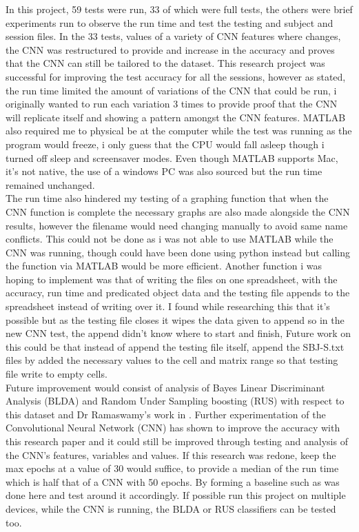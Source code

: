 In this project, 59 tests were run, 33 of which were full tests, the others were brief experiments run to observe the run time and test the testing and subject and session files. In the 33 tests, values of a variety of CNN features where changes, the CNN was restructured to provide and increase in the accuracy and proves that the CNN can still be tailored to the dataset. This research project was successful for improving the test accuracy for all the sessions, however as stated, the run time limited the amount of variations of the CNN that could be run, i originally wanted to run each variation 3 times to provide proof that the CNN will replicate itself and showing a pattern amongst the CNN features. MATLAB also required me to physical be at the computer while the test was running as the program would freeze, i only guess that the CPU would fall asleep though i turned off sleep and screensaver modes. Even though MATLAB supports Mac, it's not native, the use of a windows PC was also sourced but the run time remained unchanged. \\

The run time also hindered my testing of a graphing function that when the CNN function is complete the necessary graphs are also made alongside the CNN results, however the filename would need changing manually to avoid same name conflicts. This could not be done as i was not able to use MATLAB while the CNN was running, though could have been done using python instead but calling the function via MATLAB would be more efficient. Another function i was hoping to implement was that of writing the files on one spreadsheet, with the accuracy, run time and predicated object data and the testing file appends to the spreadsheet instead of writing over it. I found while researching this that it's possible but as the testing file closes it wipes the data given to append so in the new CNN test, the append didn't know where to start and finish, Future work on this could be that instead of append the testing file itself, append the SBJ-S.txt files by added the necessary values to the cell and matrix range so that testing file write to empty cells. \\

Future improvement would consist of analysis of Bayes Linear Discriminant Analysis (BLDA) and Random Under Sampling boosting (RUS) with respect to this dataset and Dr Ramaswamy's work in \cite{PalaniPaper}. Further experimentation of the Convolutional Neural Network (CNN) has shown to improve the accuracy with this research paper and it could still be improved through testing and analysis of the CNN's features, variables and values. If this research was redone, keep the max epochs at a value of 30 would suffice, to provide a median of the run time which is half that of a CNN with 50 epochs. By forming a baseline such as was done here and test around it accordingly. If possible run this project on multiple devices, while the CNN is running, the BLDA or RUS classifiers can be tested too.